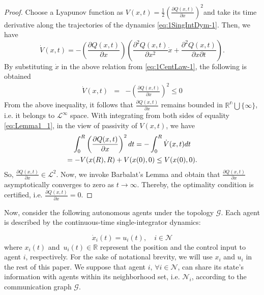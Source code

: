 \documentclass[letterpaper, 10 pt, conference]{ieeeconf}  %
\newcommand{\crb}{\color{black}}
\newcommand{\crr}{\color{black}}
\begin{document}
{\begin{proof}
	Choose a Lyapunov function as $V(x,t)=\frac{1}{2}\left(\frac{\partial Q(x,t)}{\partial x}\right)^{2}$and
	take its time derivative along the {\crb trajectories of the } dynamics \eqref{eq:1SingIntDym-1}.
	Then, we have
	\[
	\dot{V}(x,t)=-\left(\frac{\partial Q(x,t)}{\partial x}\right)\left(\frac{\partial^{2}Q(x,t)}{\partial x^{2}}\dot{x}+\frac{\partial^{2}Q(x,t)}{\partial x\partial t}\right).
	\]
	By substituting $\dot{x}$ in the above relation from \eqref{eq:1CentLaw-1},
	the following is obtained
	\begin{eqnarray}
	\dot{V}(x,t) & = & -\left(\frac{\partial Q(x,t)}{\partial x}\right)^{2}\leq0\label{eq:Lemma1_1}
	\end{eqnarray}
	From the above inequality, it follows that ${\displaystyle \frac{\partial Q(x,t)}{\partial x}}$
	remains bounded in $\mathbb{{R}^{\text{n}}\bigcup}\{\infty\}$, i.e.
	it belongs to $\mathcal{{L}^{\infty}}$ space. With integrating from
	both sides of equality \eqref{eq:Lemma1_1}, in the view of passivity
	of $V(x,t)$, we have
	\begin{gather}
	\int_{0}^{R}\left(\frac{\partial Q(x,t)}{\partial x}\right)^{2}dt=-\int_{0}^{R}\dot{V}(x,t)dt\nonumber \\
	={\crr -V(x(R),R)+V(x(0),0)\leq V(x(0),0)}.\label{eq:2The3-1-1}
	\end{gather}
	So, ${\displaystyle \frac{\partial Q(x,t)}{\partial x}}\in\mathcal{{L}}^{2}$.
	Now, we invoke Barbalat's Lemma \cite{tao1997simple} and obtain
	that ${\displaystyle \frac{\partial Q(x,t)}{\partial x}}$ asymptotically
	converges to zero as $t\rightarrow\infty$. Thereby, the optimality
	condition is certified, i.e. ${\displaystyle \frac{\partial Q(x,t)}{\partial x}=0}$.
\end{proof}

Now, consider the following autonomous agents under {\crb the topology
	$\mathcal{{G}}$.} Each agent is described by the continuous-time
single-integrator dynamics:

\begin{equation}
\ensuremath{{\dot{x}_{i}}(t)={u_{i}}(t),}\quad{i}\in\mathcal{{N}}\label{eq:AgentsDyn}
\end{equation}
where $x_{i}(t)$ and $\,u_{i}(t)\in\mathbb{R}$ represent the position
and the control input to agent $i$, respectively. For the sake of
notational brevity, we will use $x_{i}$ and $u_{i}$ in the rest
of this paper. We suppose that agent $i,\,\forall{i}\in\mathcal{{N}}$,
can share its state's information with agents {\crr within its neighborhood}
set, i.e. $\mathcal{{N}}_{i}$, according to the communication graph
$\mathcal{{G}}.$

}
\end{document}
